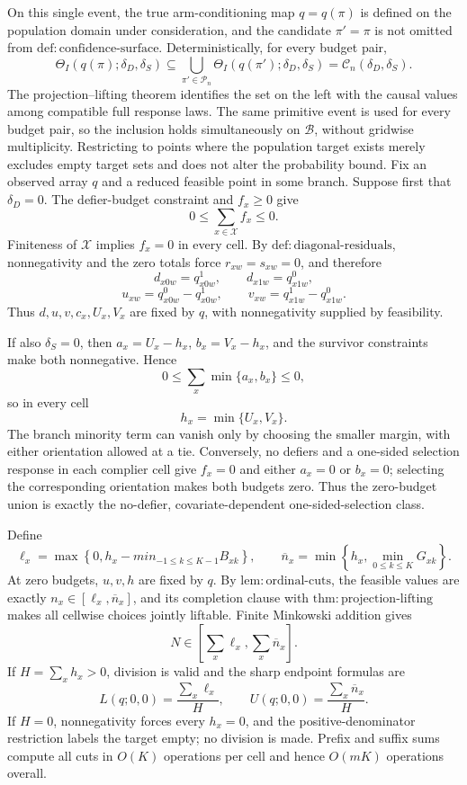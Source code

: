 On this single event, the true arm-conditioning map \(q=q(\pi)\) is defined on the population domain under consideration, and the candidate \(\pi'=\pi\) is not omitted from \(\mathrm{def:confidence\text{-}surface}\). Deterministically, for every budget pair,
\[
 \Theta_I(q(\pi);\delta_D,\delta_S)
 \subseteq
 \bigcup_{\pi'\in\mathcal P_n}
 \Theta_I(q(\pi');\delta_D,\delta_S)
 =\mathcal C_n(\delta_D,\delta_S).
\]
The projection--lifting theorem identifies the set on the left with the causal values among compatible full response laws. The same primitive event is used for every budget pair, so the inclusion holds simultaneously on \(\mathcal B\), without gridwise multiplicity. Restricting to points where the population target exists merely excludes empty target sets and does not alter the probability bound.
Fix an observed array \(q\) and a reduced feasible point in some branch. Suppose first that \(\delta_D=0\). The defier-budget constraint and \(f_x\geq0\) give
\[
 0\leq\sum_{x\in\mathcal X}f_x\leq0.
\]
Finiteness of \(\mathcal X\) implies \(f_x=0\) in every cell. By \(\mathrm{def:diagonal\text{-}residuals}\), nonnegativity and the zero totals force \(r_{xw}=s_{xw}=0\), and therefore
\[
 d_{x0w}=q^1_{x0w},
 \qquad d_{x1w}=q^0_{x1w},
\]
\[
 u_{xw}=q^0_{x0w}-q^1_{x0w},
 \qquad v_{xw}=q^1_{x1w}-q^0_{x1w}.
\]
Thus \(d,u,v,c_x,U_x,V_x\) are fixed by \(q\), with nonnegativity supplied by feasibility.

If also \(\delta_S=0\), then \(a_x=U_x-h_x\), \(b_x=V_x-h_x\), and the survivor constraints make both nonnegative. Hence
\[
 0\leq\sum_x\min\{a_x,b_x\}\leq0,
\]
so in every cell
\[
 h_x=\min\{U_x,V_x\}.
\]
The branch minority term can vanish only by choosing the smaller margin, with either orientation allowed at a tie. Conversely, no defiers and a one-sided selection response in each complier cell give \(f_x=0\) and either \(a_x=0\) or \(b_x=0\); selecting the corresponding orientation makes both budgets zero. Thus the zero-budget union is exactly the no-defier, covariate-dependent one-sided-selection class.

Define
\[
 \ell_x=\max\left\{0,h_x-min_{-1\leq k\leq K-1}B_{xk}\right\},
 \qquad
 \overline n_x=\min\left\{h_x,\min_{0\leq k\leq K}G_{xk}\right\}.
\]
At zero budgets, \(u,v,h\) are fixed by \(q\). By \(\mathrm{lem:ordinal\text{-}cuts}\), the feasible values are exactly \(n_x\in[\ell_x,\overline n_x]\), and its completion clause with \(\mathrm{thm:projection\text{-}lifting}\) makes all cellwise choices jointly liftable. Finite Minkowski addition gives
\[
 N\in\left[\sum_x\ell_x,\sum_x\overline n_x\right].
\]
If \(H=\sum_xh_x>0\), division is valid and the sharp endpoint formulas are
\[
 L(q;0,0)=\frac{\sum_x\ell_x}{H},
 \qquad
 U(q;0,0)=\frac{\sum_x\overline n_x}{H}.
\]
If \(H=0\), nonnegativity forces every \(h_x=0\), and the positive-denominator restriction labels the target empty; no division is made. Prefix and suffix sums compute all cuts in \(O(K)\) operations per cell and hence \(O(mK)\) operations overall.

